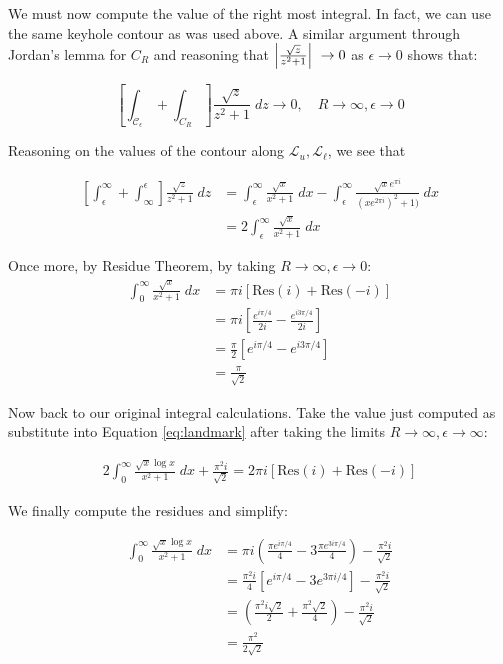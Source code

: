 \documentclass[12pt]{article}%
\newcommand{\C}{\mathcal{C}}
\newcommand{\Lcal}{\mathcal{L}}
\begin{document}
We must now compute the value of the right most integral. In fact, we can use the same keyhole contour as was used above. A similar argument through Jordan's lemma for $C_R$ and reasoning that $\abs{\frac{\sqrt{z}}{z^2 + 1}} \rightarrow 0$ as $\epsilon \rightarrow 0$ shows that:

\[\left[ \int_{\C_\epsilon} + \int_{C_R}\right] \frac{\sqrt{z}}{z^2 + 1} \; dz \rightarrow 0, \quad R\rightarrow  \infty, \epsilon \rightarrow 0 \]

Reasoning on the values of the contour along $\Lcal_u, \Lcal_\ell$, we see that

\begin{align*}
  \left[\int_\epsilon^\infty + \int_\infty^\epsilon \right] \frac{\sqrt{z}}{z^2 + 1} \; dz & =\int_\epsilon^\infty  \frac{\sqrt{x}}{x^2 + 1} \; dx - \int_\epsilon^\infty \frac{\sqrt{x}e^{\pi i}}{(xe^{2\pi i})^2 + 1)} \; dx \\
  & = 2 \int_\epsilon^\infty \frac{\sqrt{x}}{x^2 + 1} \; dx
\end{align*}

Once more, by Residue Theorem, by taking $R \rightarrow \infty, \epsilon \rightarrow 0$:
\begin{align*}
\int_{0}^\infty \frac{\sqrt{x}}{x^2 + 1} \; dx & = \pi i \left[\text{Res}(i) + \text{Res}(-i)\right] \\
& = \pi i \left[ \frac{e^{i\pi/4}}{2i} - \frac{e^{i3\pi/4}}{2i}\right] \\
& = \frac{\pi}{2} \left[e^{i\pi/4} - e^{i3\pi/4}\right] \\
& = \frac{\pi}{\sqrt{2}}
\end{align*} \newline

Now back to our original integral calculations. Take the value just computed as substitute into Equation \ref{eq:landmark} after taking the limits $R \rightarrow \infty, \epsilon \rightarrow \infty$:

\begin{align*}
  2 \int_0^\infty \frac{\sqrt{x}\log{x}}{x^2 + 1} \; dx + \frac{\pi^2 i}{\sqrt{2}} = 2\pi i \left[\text{Res}(i) + \text{Res}(-i)\right]
\end{align*}

We finally compute the residues and simplify:

\begin{align*}
  \int_0^\infty \frac{\sqrt{x}\log{x}}{x^2 + 1} \; dx & = \pi i \left(\frac{\pi e^{i\pi/4}}{4} - 3\frac{\pi e^{3i \pi/4}}{4}\right ) - \frac{\pi^2 i}{\sqrt{2}} \\
  & = \frac{\pi^2 i}{4} \left[e^{i\pi/4} - 3e^{3\pi i /4}\right] - \frac{\pi^2 i}{\sqrt{2}} \\
  & = \left(\frac{\pi^2 i \sqrt{2}}{2} + \frac{\pi^2 \sqrt{2}}{4}\right) - \frac{\pi^2 i}{\sqrt{2}} \\
  & = \frac{\pi^2}{2\sqrt{2}}
\end{align*}
\end{document}
